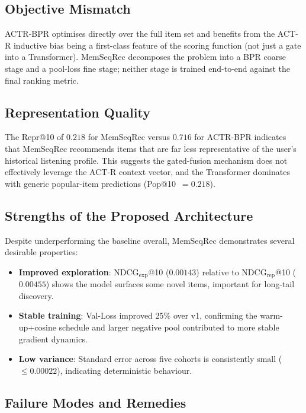 \documentclass[conference]{IEEEtran}
\begin{document}
\subsection{Objective Mismatch}

ACTR-BPR optimises directly over the full item set and benefits
from the ACT-R inductive bias being a first-class feature of the
scoring function (not just a gate into a Transformer).
MemSeqRec decomposes the problem into a BPR coarse stage and a
pool-loss fine stage; neither stage is trained end-to-end
against the final ranking metric.

\subsection{Representation Quality}

The Repr@10 of $0.218$ for MemSeqRec versus $0.716$ for ACTR-BPR
indicates that MemSeqRec recommends items that are far less
representative of the user's historical listening profile.
This suggests the gated-fusion mechanism does not effectively
leverage the ACT-R context vector, and the Transformer dominates
with generic popular-item predictions (Pop@10~$=0.218$).

\subsection{Strengths of the Proposed Architecture}

Despite underperforming the baseline overall, MemSeqRec
demonstrates several desirable properties:
\begin{itemize}
    \item \textbf{Improved exploration}: NDCG$_{\text{exp}}$@10
          ($0.00143$) relative to NDCG$_{\text{rep}}$@10
          ($0.00455$) shows the model surfaces some novel items,
          important for long-tail discovery.
    \item \textbf{Stable training}: Val-Loss improved 25\% over
          v1, confirming the warm-up+cosine schedule and larger
          negative pool contributed to more stable gradient
          dynamics.
    \item \textbf{Low variance}: Standard error across five
          cohorts is consistently small ($\leq 0.00022$),
          indicating deterministic behaviour.
\end{itemize}

\subsection{Failure Modes and Remedies}
\end{document}

